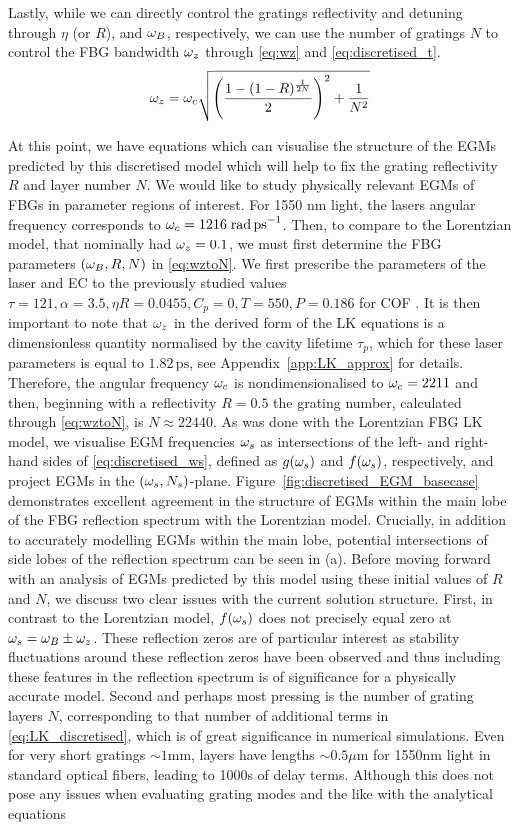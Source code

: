 %
Lastly, while we can directly control the gratings reflectivity and detuning through $\eta$ (or $R$), and $\omega_B$, respectively, we can use the number of gratings $N$ to control the FBG bandwidth $\omega_z$ through \eqref{eq:wz} and \eqref{eq:discretised_t}.
%
\begin{equation}
    \label{eq:wztoN}
    \omega_z = \omega_c \sqrt{\left( \frac{1 - (1 - R)^\frac{1}{2N}}{2} \right)^2 + \frac{1}{N^2}}
\end{equation}
%
\par
%
At this point, we have equations which can visualise the structure of the EGMs predicted by this discretised model which will help to fix the grating reflectivity $R$ and layer number $N$. We would like to study physically relevant EGMs of FBGs in parameter regions of interest. For 1550 nm light, the lasers angular frequency corresponds to $\omega_c=1216\;\text{rad\,ps}^{-1}$. Then, to compare to the Lorentzian model, that nominally had $\omega_z = 0.1$, we must first determine the FBG parameters $(\omega_B, R, N)$ in \eqref{eq:wztoN}. We first prescribe the parameters of the laser and EC to the previously studied values $\tau = 121, \alpha = 3.5, \eta R = 0.0455, C_p = 0, T = 550, P = 0.186$ for COF \cite{heil2003delay}. It is then important to note that $\omega_z$ in the derived form of the LK equations is a dimensionless quantity normalised by the cavity lifetime $\tau_p$, which for these laser parameters is equal to $1.82 \,\text{ps}$, see Appendix~\ref{app:LK_approx} for details. Therefore, the angular frequency $\omega_c$ is nondimensionalised to $\omega_c=2211$ and then, beginning with a reflectivity $R = 0.5$ the grating number, calculated through \eqref{eq:wztoN}, is $N \approx 22440$. As was done with the Lorentzian FBG LK model, we visualise EGM frequencies $\omega_s$ as intersections of the left- and right-hand sides of \eqref{eq:discretised_ws}, defined as $g(\omega_s)$ and $f(\omega_s)$, respectively, and project EGMs in the $(\omega_s, N_s)$-plane. Figure~\ref{fig:discretised_EGM_basecase} demonstrates excellent agreement in the structure of EGMs within the main lobe of the FBG reflection spectrum with the Lorentzian model. Crucially, in addition to accurately modelling EGMs within the main lobe, potential intersections of side lobes of the reflection spectrum can be seen in (a). Before moving forward with an analysis of EGMs predicted by this model using these initial values of $R$ and $N$, we discuss two clear issues with the current solution structure. First, in contrast to the Lorentzian model, $f(\omega_s)$ does not precisely equal zero at $\omega_s = \omega_B \pm \omega_z$. These reflection zeros are of particular interest as stability fluctuations around these reflection zeros have been observed and thus including these features in the reflection spectrum is of significance for a physically accurate model. Second and perhaps most pressing is the number of grating layers $N$, corresponding to that number of additional terms in \eqref{eq:LK_discretised}, which is of great significance in numerical simulations. Even for very short gratings $\sim 1\text{mm}$, layers have lengths $\sim 0.5\mu\text{m}$ for 1550nm light in standard optical fibers, leading to 1000s of delay terms. Although this does not pose any issues when evaluating grating modes and the like with the analytical equations 
